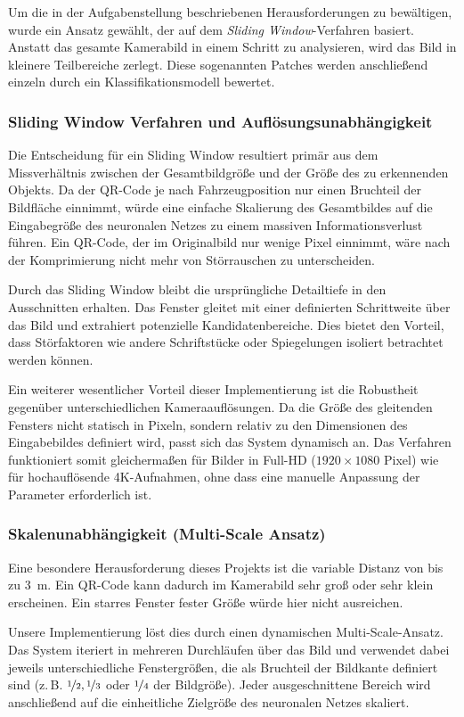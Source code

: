\documentclass[
    a4paper,        %
    11pt,           %
    ngerman,        %
    parskip=half,   %
    listof=totoc,   %
    bibliography=totoc %
]{scrartcl}
\begin{document}
Um die in der Aufgabenstellung beschriebenen Herausforderungen zu bewältigen, wurde ein Ansatz gewählt, der auf dem \textit{Sliding Window}-Verfahren basiert. Anstatt das gesamte Kamerabild in einem Schritt zu analysieren, wird das Bild in kleinere Teilbereiche zerlegt. Diese sogenannten Patches werden anschließend einzeln durch ein Klassifikationsmodell bewertet.

\subsubsection{Sliding Window Verfahren und Auflösungsunabhängigkeit}
Die Entscheidung für ein Sliding Window resultiert primär aus dem Missverhältnis zwischen der Gesamtbildgröße und der Größe des zu erkennenden Objekts. Da der QR-Code je nach Fahrzeugposition nur einen Bruchteil der Bildfläche einnimmt, würde eine einfache Skalierung des Gesamtbildes auf die Eingabegröße des neuronalen Netzes zu einem massiven Informationsverlust führen. Ein QR-Code, der im Originalbild nur wenige Pixel einnimmt, wäre nach der Komprimierung nicht mehr von Störrauschen zu unterscheiden.

Durch das Sliding Window bleibt die ursprüngliche Detailtiefe in den Ausschnitten erhalten. Das Fenster gleitet mit einer definierten Schrittweite über das Bild und extrahiert potenzielle Kandidatenbereiche. Dies bietet den Vorteil, dass Störfaktoren wie andere Schriftstücke oder Spiegelungen isoliert betrachtet werden können.

Ein weiterer wesentlicher Vorteil dieser Implementierung ist die Robustheit gegenüber unterschiedlichen Kameraauflösungen. Da die Größe des gleitenden Fensters nicht statisch in Pixeln, sondern relativ zu den Dimensionen des Eingabebildes definiert wird, passt sich das System dynamisch an. Das Verfahren funktioniert somit gleichermaßen für Bilder in Full-HD ($1920 \times 1080$ Pixel) wie für hochauflösende 4K-Aufnahmen, ohne dass eine manuelle Anpassung der Parameter erforderlich ist.

\subsubsection{Skalenunabhängigkeit (Multi-Scale Ansatz)}
Eine besondere Herausforderung dieses Projekts ist die variable Distanz von bis zu \SI{3}{\meter}. Ein QR-Code kann dadurch im Kamerabild sehr groß oder sehr klein erscheinen. Ein starres Fenster fester Größe würde hier nicht ausreichen.

Unsere Implementierung löst dies durch einen dynamischen Multi-Scale-Ansatz. Das System iteriert in mehreren Durchläufen über das Bild und verwendet dabei jeweils unterschiedliche Fenstergrößen, die als Bruchteil der Bildkante definiert sind (z.\,B. $\nicefrac{1}{2}, \nicefrac{1}{3}$ oder $\nicefrac{1}{4}$ der Bildgröße). Jeder ausgeschnittene Bereich wird anschließend auf die einheitliche Zielgröße des neuronalen Netzes skaliert.
\end{document}

